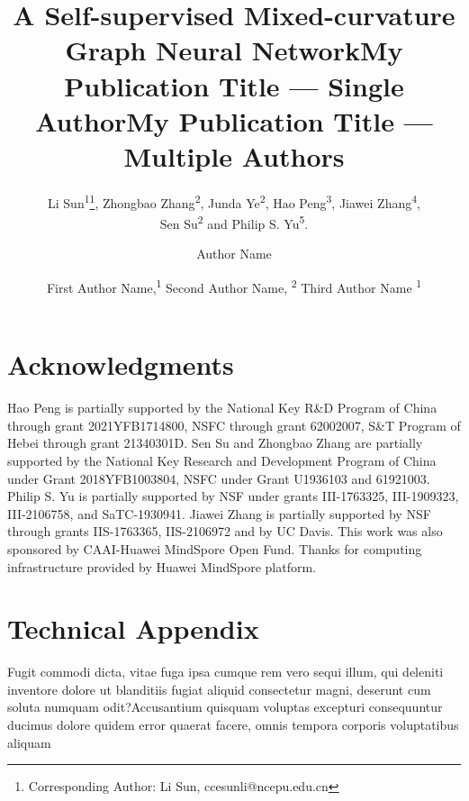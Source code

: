 \documentclass[letterpaper]{article}
\title{A Self-supervised Mixed-curvature Graph Neural Network}
\author{
Li Sun\textsuperscript{\rm 1}\thanks{Corresponding Author: Li Sun, ccesunli@ncepu.edu.cn},  Zhongbao Zhang\textsuperscript{\rm 2}, Junda Ye\textsuperscript{\rm 2}, Hao Peng\textsuperscript{\rm 3}, Jiawei Zhang\textsuperscript{\rm 4}, \\Sen Su\textsuperscript{\rm 2}  and Philip S. Yu\textsuperscript{\rm 5}.
}
\title{My Publication Title --- Single Author}
\author {
    Author Name
}
\title{My Publication Title --- Multiple Authors}
\author {
    First Author Name,\textsuperscript{\rm 1}
    Second Author Name, \textsuperscript{\rm 2}
    Third Author Name \textsuperscript{\rm 1}
}
\begin{document}
\maketitle








\section{Acknowledgments}
Hao Peng is partially supported by the National Key R\&D Program of China through grant 2021YFB1714800,  NSFC through grant 62002007, S\&T Program of Hebei through grant 21340301D.
Sen Su and Zhongbao Zhang are partially supported by the National Key Research and Development Program of China under Grant 2018YFB1003804, NSFC under Grant U1936103 and 61921003.
Philip S. Yu is partially supported by NSF under grants III-1763325, III-1909323,  III-2106758, and SaTC-1930941.
Jiawei Zhang is partially supported by NSF through grants IIS-1763365, IIS-2106972 and by UC Davis.
This work was also sponsored by CAAI-Huawei MindSpore Open Fund.
Thanks for computing infrastructure provided by Huawei MindSpore platform.

\section{Technical Appendix}

Fugit commodi dicta, vitae fuga ipsa cumque rem vero sequi illum, qui deleniti inventore dolore ut blanditiis fugiat aliquid consectetur magni, deserunt cum soluta numquam odit?Accusantium quisquam voluptas excepturi consequuntur ducimus dolore quidem error quaerat facere, omnis tempora corporis voluptatibus aliquam

\end{document}
